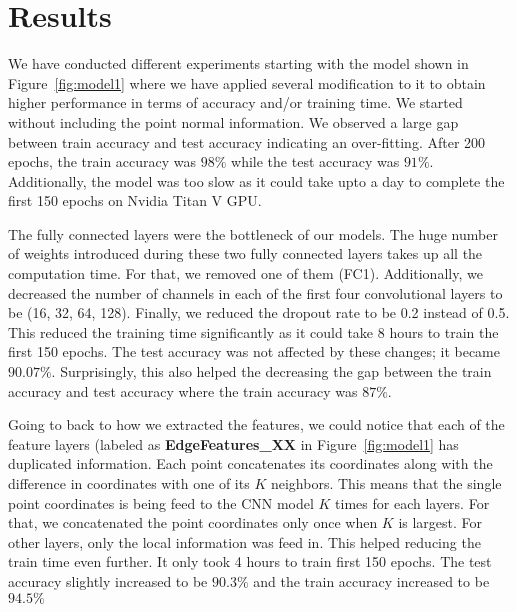 \section{Results}
We have conducted different experiments starting with the model shown in Figure~\ref{fig:model1} where we have applied several modification to it to obtain higher performance in terms of accuracy and/or training time. We started without including the point normal information. We observed a large gap between train accuracy and test accuracy indicating an over-fitting. After 200 epochs, the train accuracy was $98\%$ while the test accuracy was $91\%$. Additionally, the model was too slow as it could take upto a day to complete the first 150 epochs on Nvidia Titan V GPU. 

The fully connected layers were the bottleneck of our models. The huge number of weights introduced during these two fully connected layers takes up all the computation time. For that, we removed one of them (FC1). Additionally, we decreased the number of channels in each of the first four convolutional layers to be (16, 32, 64, 128). Finally, we reduced the dropout rate to be 0.2 instead of 0.5. This reduced the training time significantly as it could take 8 hours to train the first 150 epochs. The test accuracy was not affected by these changes; it became $90.07\%$. Surprisingly, this also helped the decreasing the gap between the train accuracy and test accuracy where the train accuracy was $87\%$. 

Going to back to how we extracted the features, we could notice that each of the feature layers (labeled as \textbf{EdgeFeatures\_XX} in Figure~\ref{fig:model1} has duplicated information. Each point concatenates its coordinates along with the difference in coordinates with one of its $K$ neighbors. This means that the single point coordinates is being feed to the CNN model $K$ times for each layers. For that, we concatenated the point coordinates only once when $K$ is largest. For other layers, only the local information was feed in. This helped reducing the train time even further. It only took 4 hours to train first 150 epochs. The test accuracy slightly increased to be $90.3\%$ and the train accuracy increased to be $94.5\%$ 

